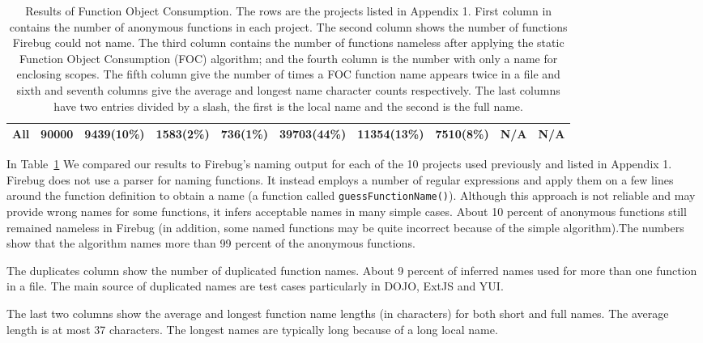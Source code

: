 \documentclass[10pt, preprint]{sigplanconf}
\begin{document}
\begin{table}
{\begin{tabular}{ | l | l | l | l | l | l | l | l | l | l |}
  \hline 
   All           & 90000     &   9439(10\%)   & 1583(2\%) & 736(1\%)  &    39703(44\%)      &    11354(13\%) & 7510(8\%)  & N/A       & N/A         \\ 
  \hline       
  \end{tabular}
  }
 \label{evaluation} 
\caption{Results of Function Object Consumption. The rows are the projects listed in Appendix 1. First column in  contains the number of anonymous functions in each project. The second column shows the number of functions Firebug could not name. The third column contains the number of functions nameless after applying the static Function Object Consumption (FOC) algorithm;  and the fourth column is the number with only a name for enclosing scopes. The fifth column give the number of times a FOC function name appears twice in a file and sixth and seventh columns give the average and longest name character counts respectively. The last columns have two entries divided by a slash, the first is the local name and the second is the full name.} 
\end{table}    


In Table~\ref{evaluation} We compared our results to Firebug's naming output for each of the 10 projects used previously and listed in Appendix 1. Firebug does not use a parser for naming functions. It instead employs a number of regular expressions and apply them on a few lines around the function definition to obtain a name  (a function called {\small \texttt{guessFunctionName()}}). Although this approach is not reliable and may provide wrong names for some functions, it infers acceptable names in many simple cases. About 10 percent of anonymous functions still remained nameless in Firebug (in addition, some named functions may be quite incorrect because of the simple algorithm).The numbers show that the algorithm names more than 99 percent of the anonymous functions.


The duplicates column show the number of duplicated function names. About 9 percent of inferred names used for more than one function in a file. The main source of duplicated names are test cases particularly in DOJO, ExtJS and YUI. 

The last two columns show the average and longest function name lengths (in characters) for both short and full names. The average length is at most 37 characters. The longest  names are typically long because of a long local name.  
\end{document}
